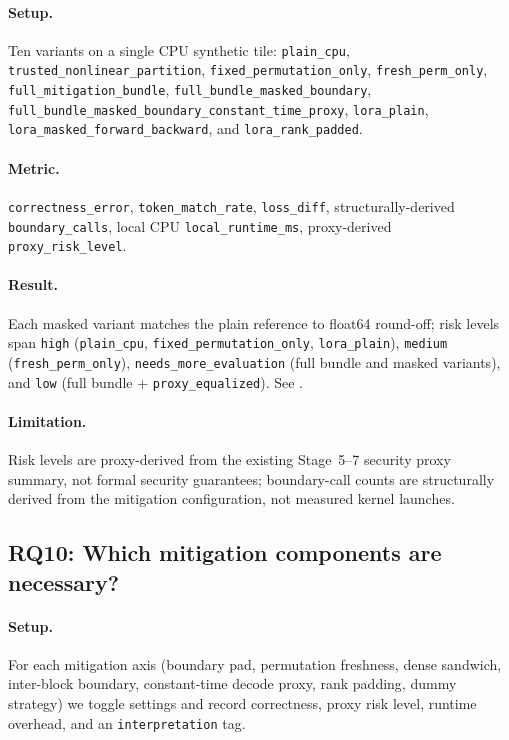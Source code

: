 \paragraph{Setup.} Ten variants on a single CPU synthetic tile: \texttt{plain\_cpu}, \texttt{trusted\_nonlinear\_partition}, \texttt{fixed\_permutation\_only}, \texttt{fresh\_perm\_only}, \texttt{full\_mitigation\_bundle}, \texttt{full\_bundle\_masked\_boundary}, \texttt{full\_bundle\_masked\_boundary\_constant\_time\_proxy}, \texttt{lora\_plain}, \texttt{lora\_masked\_forward\_backward}, and \texttt{lora\_rank\_padded}.

\paragraph{Metric.} \texttt{correctness\_error}, \texttt{token\_match\_rate}, \texttt{loss\_diff}, structurally-derived \texttt{boundary\_calls}, local CPU \texttt{local\_runtime\_ms}, proxy-derived \texttt{proxy\_risk\_level}.

\paragraph{Result.} Each masked variant matches the plain reference to float64 round-off; risk levels span \texttt{high} (\texttt{plain\_cpu}, \texttt{fixed\_permutation\_only}, \texttt{lora\_plain}), \texttt{medium} (\texttt{fresh\_perm\_only}), \texttt{needs\_more\_evaluation} (full bundle and masked variants), and \texttt{low} (full bundle + \texttt{proxy\_equalized}). See .

\paragraph{Limitation.} Risk levels are proxy-derived from the existing Stage~5--7 security proxy summary, not formal security guarantees; boundary-call counts are structurally derived from the mitigation configuration, not measured kernel launches.



\subsection{RQ10: Which mitigation components are necessary?}
\label{sec:eval:rq10}
\paragraph{Setup.} For each mitigation axis (boundary pad, permutation freshness, dense sandwich, inter-block boundary, constant-time decode proxy, rank padding, dummy strategy) we toggle settings and record correctness, proxy risk level, runtime overhead, and an \texttt{interpretation} tag.

